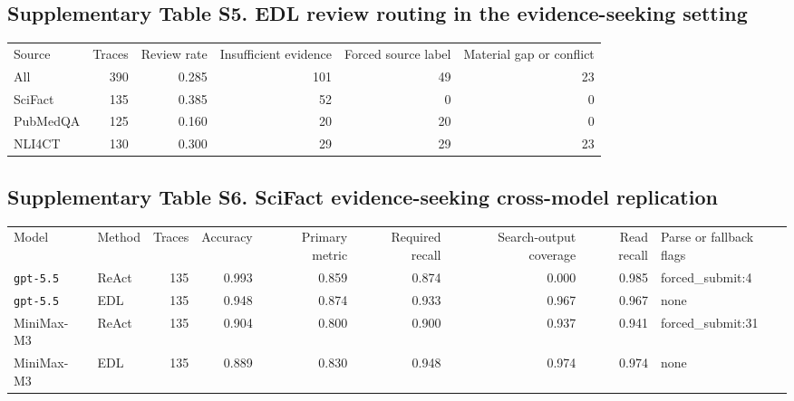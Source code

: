 \documentclass[
  8pt,
]{extarticle}
\begin{document}
\hypertarget{supplementary-table-s5-edl-review-routing-in-the-evidence-seeking-setting}{%
\subsection{Supplementary Table S5. EDL review routing in the
evidence-seeking
setting}\label{supplementary-table-s5-edl-review-routing-in-the-evidence-seeking-setting}}

\begin{center}
\begin{adjustbox}{max width=0.95\textwidth}
\begin{tabular}{@{}
lrrrrr@{}}
\toprule\noalign{}
Source & Traces & Review rate & Insufficient evidence & Forced source
label & Material gap or conflict \\

All & 390 & 0.285 & 101 & 49 & 23 \\
SciFact & 135 & 0.385 & 52 & 0 & 0 \\
PubMedQA & 125 & 0.160 & 20 & 20 & 0 \\
NLI4CT & 130 & 0.300 & 29 & 29 & 23 \\
\bottomrule
\end{tabular}
\end{adjustbox}
\end{center}

\hypertarget{supplementary-table-s6-scifact-evidence-seeking-cross-model-replication}{%
\subsection{Supplementary Table S6. SciFact evidence-seeking cross-model
replication}\label{supplementary-table-s6-scifact-evidence-seeking-cross-model-replication}}

\begin{center}
\begin{adjustbox}{max width=0.95\textwidth}
\begin{tabular}{@{}
llrrrrrrl@{}}
\toprule\noalign{}
Model & Method & Traces & Accuracy & Primary metric & Required recall &
Search-output coverage & Read recall & Parse or fallback flags \\

\texttt{gpt-5.5} & ReAct & 135 & 0.993 & 0.859 & 0.874 & 0.000 & 0.985 &
forced\_submit:4 \\
\texttt{gpt-5.5} & EDL & 135 & 0.948 & 0.874 & 0.933 & 0.967 & 0.967 &
none \\
MiniMax-M3 & ReAct & 135 & 0.904 & 0.800 & 0.900 & 0.937 & 0.941 &
forced\_submit:31 \\
MiniMax-M3 & EDL & 135 & 0.889 & 0.830 & 0.948 & 0.974 & 0.974 & none \\
\bottomrule
\end{tabular}
\end{adjustbox}
\end{center}
\end{document}
